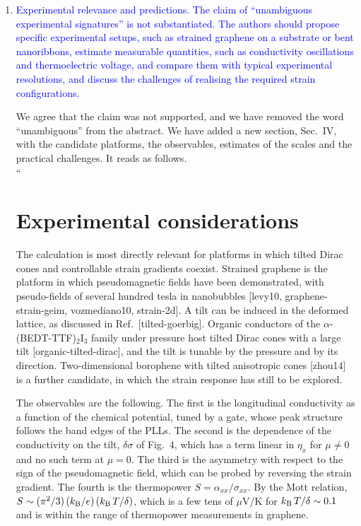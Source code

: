 \documentclass[aps,prb,onecolumn,nofootinbib,citeautoscript,10pt]{revtex4-2}
\begin{document}
\begin{enumerate}
\item \textcolor{blue}{Experimental relevance and predictions. The claim of ``unambiguous experimental signatures'' is not substantiated. The authors should propose specific experimental setups, such as strained graphene on a substrate or bent nanoribbons, estimate measurable quantities, such as conductivity oscillations and thermoelectric voltage, and compare them with typical experimental resolutions, and discuss the challenges of realising the required strain configurations.}

We agree that the claim was not supported, and we have removed the word ``unambiguous'' from the abstract. We have added a new section, Sec.~IV, with the candidate platforms, the observables, estimates of the scales and the practical challenges. It reads as follows.\\``\section{Experimental considerations}
The calculation is most directly relevant for platforms in which tilted Dirac cones and controllable strain gradients coexist. Strained graphene is the platform in which pseudomagnetic fields have been demonstrated, with pseudo-fields of several hundred tesla in nanobubbles [levy10, graphene-strain-geim, vozmediano10, strain-2d]. A tilt can be induced in the deformed lattice, as discussed in Ref.~[tilted-goerbig]. Organic conductors of the $\alpha$-(BEDT-TTF)$_2$I$_3$ family under pressure host tilted Dirac cones with a large tilt [organic-tilted-dirac], and the tilt is tunable by the pressure and by its direction. Two-dimensional borophene with tilted anisotropic cones [zhou14] is a further candidate, in which the strain response has still to be explored.

The observables are the following. The first is the longitudinal conductivity as a function of the chemical potential, tuned by a gate, whose peak structure follows the band edges of the PLLs. The second is the dependence of the conductivity on the tilt, $\delta\sigma$ of Fig.~4, which has a term linear in $\eta_x$ for $\mu\neq0$ and no such term at $\mu=0$. The third is the asymmetry with respect to the sign of the pseudomagnetic field, which can be probed by reversing the strain gradient. The fourth is the thermopower $S=\alpha_{xx}/\sigma_{xx}$. By the Mott relation, $S\sim(\pi^2/3)\,(k_{\rm B}/e)\,(k_{\rm B}\,T/\delta)$, which is a few tens of $\mu$V/K for $k_{\rm B}\,T/\delta\sim0.1$ and is within the range of thermopower measurements in graphene.


\end{enumerate}
\end{document}
